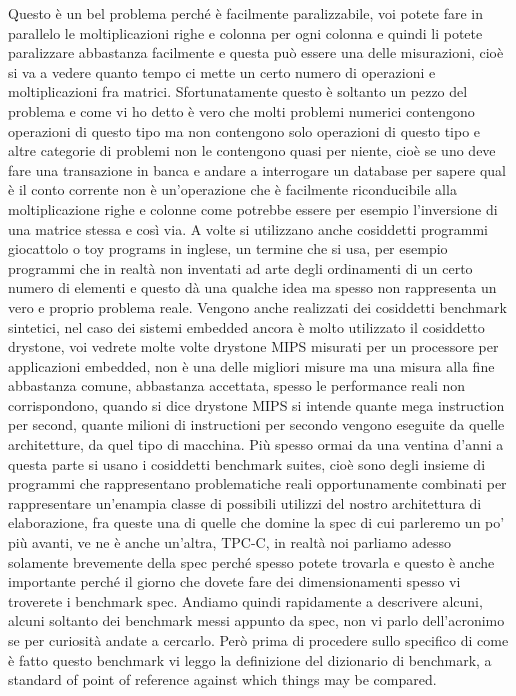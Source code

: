 Questo è un bel problema perché è facilmente paralizzabile, voi potete fare in parallelo le moltiplicazioni righe e colonna per ogni colonna e quindi li potete paralizzare abbastanza facilmente e questa può essere una delle misurazioni, cioè si va a vedere quanto tempo ci mette un certo numero di operazioni e moltiplicazioni fra matrici.
Sfortunatamente questo è soltanto un pezzo del problema e come vi ho detto è vero che molti problemi numerici contengono operazioni di questo tipo ma non contengono solo operazioni di questo tipo e altre categorie di problemi non le contengono quasi per niente, cioè se uno deve fare una transazione in banca e andare a interrogare un database per sapere qual è il conto corrente non è un'operazione che è facilmente riconducibile alla moltiplicazione righe e colonne come potrebbe essere per esempio l'inversione di una matrice stessa e così via.
A volte si utilizzano anche cosiddetti programmi giocattolo o toy programs in inglese, un termine che si usa, per esempio programmi che in realtà non inventati ad arte degli ordinamenti di un certo numero di elementi e questo dà una qualche idea ma spesso non rappresenta un vero e proprio problema reale.
Vengono anche realizzati dei cosiddetti benchmark sintetici, nel caso dei sistemi embedded ancora è molto utilizzato il cosiddetto drystone, voi vedrete molte volte drystone MIPS misurati per un processore per applicazioni embedded, non è una delle migliori misure ma una misura alla fine abbastanza comune, abbastanza accettata, spesso le performance reali non corrispondono, quando si dice drystone MIPS si intende quante mega instruction per second, quante milioni di instructioni per secondo vengono eseguite da quelle architetture, da quel tipo di macchina.
Più spesso ormai da una ventina d'anni a questa parte si usano i cosiddetti benchmark suites, cioè sono degli insieme di programmi che rappresentano problematiche reali opportunamente combinati per rappresentare un'enampia classe di possibili utilizzi del nostro architettura di elaborazione, fra queste una di quelle che domine la spec di cui parleremo un po' più avanti, ve ne è anche un'altra, TPC-C, in realtà noi parliamo adesso solamente brevemente della spec perché spesso potete trovarla e questo è anche importante perché il giorno che dovete fare dei dimensionamenti spesso vi troverete i benchmark spec.
Andiamo quindi rapidamente a descrivere alcuni, alcuni soltanto dei benchmark messi appunto da spec, non vi parlo dell'acronimo se per curiosità andate a cercarlo.
Però prima di procedere sullo specifico di come è fatto questo benchmark vi leggo la definizione del dizionario di benchmark, a standard of point of reference against which things may be compared.
